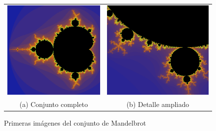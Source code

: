 \begin{figure}[ht]
\begin{tabular}{cc}
    \includegraphics[scale=0.28]{./img/C3/mandelbrot-intro.png} &   \includegraphics[scale=0.255]{./img/C3/detalle-Mandelbrot.png} \\
  (a) Conjunto completo & (b) Detalle ampliado  \\[6pt]
  \end{tabular}
    \caption{Primeras imágenes del conjunto de Mandelbrot}
    \label{fig:mandelbrot-intro}
\end{figure}

